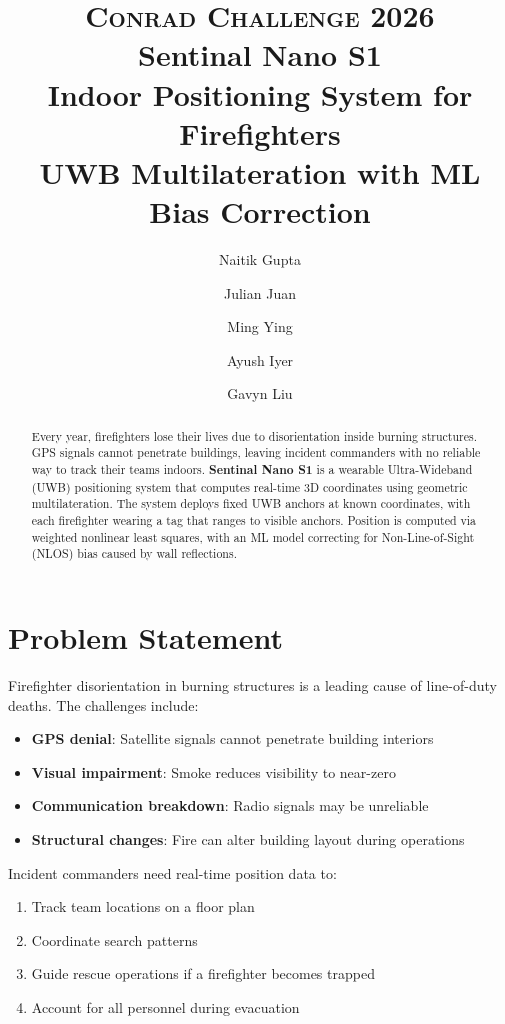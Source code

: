 \documentclass[11pt,a4paper]{article}
\title{
    \vspace{-1cm}
    {\Large\textsc{Conrad Challenge 2026}}\\[0.5em]
    {\Huge\textbf{Sentinal Nano S1}}\\[0.3em]
    {\large Indoor Positioning System for Firefighters}\\[0.3em]
    {\normalsize UWB Multilateration with ML Bias Correction}
}
\author{
    Naitik Gupta \and Julian Juan \and Ming Ying \and Ayush Iyer \and Gavyn Liu
}
\date{}
\begin{document}
\maketitle
\thispagestyle{empty}

\begin{abstract}
Every year, firefighters lose their lives due to disorientation inside burning structures. GPS signals cannot penetrate buildings, leaving incident commanders with no reliable way to track their teams indoors. \textbf{Sentinal Nano S1} is a wearable Ultra-Wideband (UWB) positioning system that computes real-time 3D coordinates using geometric multilateration. The system deploys fixed UWB anchors at known coordinates, with each firefighter wearing a tag that ranges to visible anchors. Position is computed via weighted nonlinear least squares, with an ML model correcting for Non-Line-of-Sight (NLOS) bias caused by wall reflections.
\end{abstract}

\tableofcontents
\newpage

\section{Problem Statement}

Firefighter disorientation in burning structures is a leading cause of line-of-duty deaths. The challenges include:

\begin{itemize}[leftmargin=2em]
    \item \textbf{GPS denial}: Satellite signals cannot penetrate building interiors
    \item \textbf{Visual impairment}: Smoke reduces visibility to near-zero
    \item \textbf{Communication breakdown}: Radio signals may be unreliable
    \item \textbf{Structural changes}: Fire can alter building layout during operations
\end{itemize}

Incident commanders need real-time position data to:
\begin{enumerate}
    \item Track team locations on a floor plan
    \item Coordinate search patterns
    \item Guide rescue operations if a firefighter becomes trapped
    \item Account for all personnel during evacuation
\end{enumerate}
\end{document}
